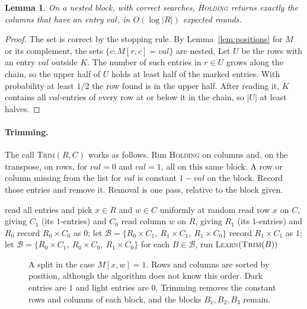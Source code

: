 \documentclass[11pt]{article}
\newtheorem{lemma}[theorem]{Lemma}
\theoremstyle{remark}
\newcommand{\AlgHold}{\textup{\textsc{Holding}}}
\newcommand{\AlgTrim}{\textup{\textsc{Trim}}}
\newcommand{\AlgLearn}{\textup{\textsc{Learn}}}
\begin{document}
\begin{lemma}\label{lem:holding}
On a nested block, with correct searches, \AlgHold{} returns exactly the columns that have an entry $\mathit{val}$, in $O(\log|R|)$ expected rounds.
\end{lemma}
\begin{proof}
The set is correct by the stopping rule. By Lemma~\ref{lem:positions} for $M$ or its complement, the sets $\{c:M[r,c]=\mathit{val}\}$ are nested. Let $U$ be the rows with an entry $\mathit{val}$ outside $K$. The number of such entries in $r\in U$ grows along the chain, so the upper half of $U$ holds at least half of the marked entries. With probability at least $1/2$ the row found is in the upper half. After reading it, $K$ contains all $\mathit{val}$-entries of every row at or below it in the chain, so $|U|$ at least halves.
\end{proof}

\paragraph{Trimming.} The call \AlgTrim$(R,C)$ works as follows. Run \AlgHold{} on columns and, on the transpose, on rows, for $\mathit{val}=0$ and $\mathit{val}=1$, all on this same block. A row or column missing from the list for $\mathit{val}$ is constant $1-\mathit{val}$ on the block. Record those entries and remove it. Removal is one pass, relative to the block given.

\begin{algorithm}[h]
\caption{\AlgLearn$(R,C)$}
\begin{algorithmic}[1]
 read all entries and \Return \EndIf
\State pick $x\in R$ and $w\in C$ uniformly at random
\State read row $x$ on $C$, giving $C_1$ (its $1$-entries) and $C_0$
\State read column $w$ on $R$, giving $R_1$ (its $1$-entries) and $R_0$
  \State record $R_0\times C_0$ as $0$; let $\mathcal B=\{R_0\times C_1,\ R_1\times C_1,\ R_1\times C_0\}$
\Else
  \State record $R_1\times C_1$ as $1$; let $\mathcal B=\{R_0\times C_1,\ R_0\times C_0,\ R_1\times C_0\}$
\EndIf
\State for each $B\in\mathcal B$, run \AlgLearn$(\AlgTrim(B))$
\end{algorithmic}
\end{algorithm}

\begin{figure}[t]
\centering

\caption{A split in the case $M[x,w]=1$. Rows and columns are sorted by position, although the algorithm does not know this order. Dark entries are $1$ and light entries are $0$. Trimming removes the constant rows and columns of each block, and the blocks $B_1,B_2,B_3$ remain.}
\label{fig:split}
\end{figure}
\end{document}
